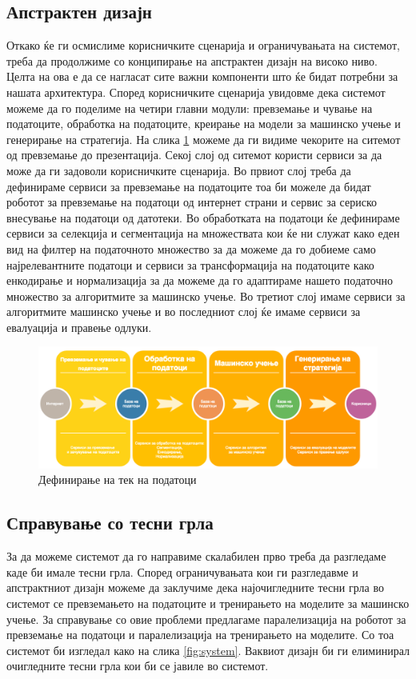 \subsection{Апстрактен дизајн}
Откако ќе ги осмислиме корисничките сценарија и ограничувањата на системот, треба да продолжиме со конципирање на апстрактен дизајн на високо ниво. Целта на ова е да се нагласат сите важни компоненти што ќе бидат потребни за нашата архитектура.
Според корисничките сценарија увидовме дека системот можеме да го поделиме на четири главни модули: превземање и чување на податоците, обработка на податоците, креирање на модели за машинско учење и генерирање на стратегија. На слика \ref{fig:tek} можеме да ги видиме чекорите на ситемот од превземање до презентација. Секој слој од ситемот користи сервиси за да може да ги задоволи корисничките сценарија. Во првиот слој треба да дефинираме сервиси за превземање на податоците тоа би можеле да бидат роботот за превземање на податоци од интернет страни и сервис за сериско внесување на податоци од датотеки. Во обработката на податоци ќе дефинираме сервиси за селекција и сегментација на множествата кои ќе ни служат како еден вид на филтер на податочното множество за да можеме да го добиеме само најрелевантните податоци и сервиси за трансформација на податоците како енкодирање и нормализација за да можеме да го адаптираме нашето податочно множество за алгоритмите за машинско учење. Во третиот слој имаме сервиси за алгоритмите машинско учење и во последниот слој ќе имаме сервиси за евалуација и правење одлуки.

\begin{figure}[hbtp]
\centering
\includegraphics[scale=0.34]{images/Tek_na_podatocite.png}
\caption{Дефинирање на тек на податоци}
\label{fig:tek}
\centering
\end{figure}

\subsection{Справување со тесни грла}
За да можеме системот да го направиме скалабилен прво треба да разгледаме каде би имале тесни грла. Според ограничувањата кои ги разгледавме и апстрактниот дизајн можеме да заклучиме дека најочигледните тесни грла во системот се превземањето на податоците и тренирањето на моделите за машинско учење. За справување со овие проблеми предлагаме паралелизација на роботот за превземање на податоци и паралелизација на тренирањето на моделите. Со тоа системот би изгледал како на слика \ref{fig:system}. Ваквиот дизајн би ги елиминирал очигледните тесни грла кои би се јавиле во системот.

